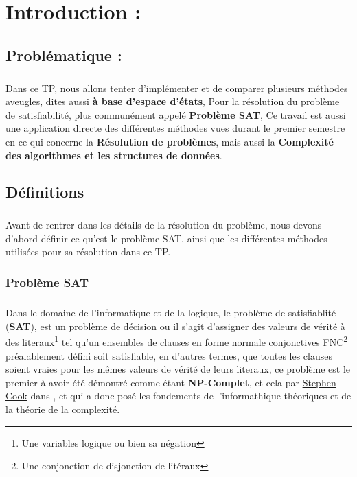 \chapter{Introduction : }
\section{Problématique : }
\paragraph{}
Dans ce TP, nous allons tenter d'implémenter et de comparer plusieurs méthodes aveugles, dites aussi \textbf{à base d'espace d'états}, Pour la résolution du problème de satisfiabilité, plus communément appelé \textbf{Problème SAT}, Ce travail est aussi une application directe des différentes méthodes vues durant le premier semestre en ce qui concerne la \textbf{Résolution de problèmes}, mais aussi la \textbf{Complexité des algorithmes et les structures de données}.
\section{Définitions}
\paragraph{}
Avant de rentrer dans les détails de la résolution du problème, nous devons d'abord définir ce qu'est le problème SAT, ainsi que les différentes méthodes utilisées pour sa résolution dans ce TP.
\subsection{Problème SAT}
\paragraph{}
Dans le domaine de l'informatique et de la logique, le problème de satisfiablité (\textbf{SAT}), est un problème de décision ou il s'agit d'assigner des valeurs de vérité à des literaux\footnote{Une variables logique ou bien sa négation} tel qu'un ensembles de clauses en forme normale conjonctives FNC\footnote{Une conjonction de disjonction de litéraux} préalablement défini soit satisfiable, en d'autres termes, que toutes les clauses soient vraies pour les mêmes valeurs de vérité de leurs literaux, ce problème est le premier à avoir été démontré comme étant \textbf{NP-Complet}, et cela par \href{https://en.wikipedia.org/wiki/Stephen_Cook}{Stephen Cook} dans \cite{cook}, et qui a donc posé les fondements de l'informathique théoriques et de la théorie de la complexité.
\newpage
